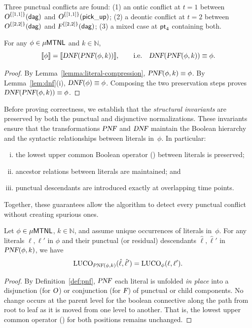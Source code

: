\begin{example}
Three punctual conflicts are found:  
(1) an ontic conflict at $t=1$ between $\textsl{O}^{\{[1,1]\}}(\mathsf{\mathsf{dag}})$ and $\textsl{O}^{\{[1,1]\}}(\mathsf{{\mathsf{pick\_up}}})$;  
(2) a deontic conflict at $t=2$ between $\textsl{O}^{\{[2,2]\}}(\mathsf{\mathsf{dag}})$ and $\textsl{F}^{\{[2,2]\}}(\mathsf{\mathsf{dag}})$;  
(3) a mixed case at $\mathsf{pt}_4$ containing both.
\end{example}

\begin{lemma}\label{lem:dpnf-semantics}
For any $\phi\in\mathsf{\mu MTNL}$ and $k\in\mathbb{N}$,
\[
\llbracket \phi \rrbracket
=\llbracket \textsl{DNF}(\textsl{PNF}(\phi,k)) \rrbracket,
\qquad
\text{i.e.}\quad
\textsl{DNF}(\textsl{PNF}(\phi,k))\equiv  \phi.
\]
\end{lemma}

\begin{proof}
By Lemma~\ref{lemma:literal-compression}, $\textsl{PNF}(\phi,k)\equiv \phi$.  
By Lemma~\ref{lem:dnf}(i), $\textsl{DNF}(\phi)\equiv \phi$.  
Composing the two preservation steps proves $\textsl{DNF}(\textsl{PNF}(\phi,k))\equiv \phi$.
\end{proof}

Before proving correctness, we establish that the \emph{structural invariants} are preserved by both the
punctual and disjunctive normalizations. These invariants ensure that the transformations
$\textsl{PNF}$ and $\textsl{DNF}$ maintain the Boolean hierarchy and the syntactic relationships between
literals in~$\phi$. In particular:
\begin{enumerate}[(i)]
\item the lowest upper common Boolean operator (\LUCO) between literals is preserved;
\item ancestor relations between literals are maintained; and
\item punctual descendants are introduced exactly at overlapping time points.
\end{enumerate}
Together, these guarantees allow the algorithm to detect every punctual conflict without
creating spurious ones.

\begin{lemma}\label{lem:pnf-luco}
Let $\phi\in\mathsf{\mu MTNL}$, $k\in\mathbb{N}$, and assume unique occurrences of literals in~$\phi$.
For any literals $\ell,\ell'$ in $\phi$ and their punctual (or residual) descendants
$\hat\ell,\hat\ell'$ in $\textsl{PNF}(\phi,k)$, we have
\[
\mathrm{LUCO}_{\textsl{PNF}(\phi,k)}(\hat\ell,\hat\ell')=\mathrm{LUCO}_\phi(\ell,\ell').
\]
\end{lemma}

\begin{proof}
By Definition~\ref{def:pnf}, $\textsl{PNF}$ each literal is unfolded \emph{in place} into a disjunction
(for $\textsl{O}$) or conjunction (for $\textsl{F}$) of punctual or child components.
No change occurs at the parent level for the boolean connective along the path from root to leaf as it is moved from one level to another.
That is, the lowest upper common operator (\LUCO) for both positions remains unchanged.
\end{proof}

